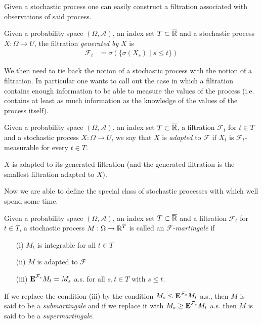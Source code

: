 Given a stochastic process one can easily construct a filtration
associated with observations of said process.
\begin{defn}Given a probability space $(\Omega,  \mathcal{A})$, an
  index set $T \subset \overline{\mathbb{R}}$ and a stochastic process $X
  : \Omega \to U$, the filtration \emph{generated by} $X$ is 
\begin{align*}
\mathcal{F}_t &= \sigma(\lbrace \sigma(X_s) \mid s \leq t \rbrace)
\end{align*}
\end{defn}

We then need to tie back the notion of a stochastic process with the
notion of a filtration.  In particular one wants to call out the case
in which a filtration contains enough information to be able to
measure the values of the process (i.e. contains at least as much
information as the knowledge of the values of the process itself).
\begin{defn}Given a probability space $(\Omega,  \mathcal{A})$, an
  index set $T \subset \overline{\mathbb{R}}$, a
  filtration $\mathcal{F}_t$ for $t \in T$ and a stochastic process $X
  : \Omega \to U$, we say that $X$ is \emph{adapted} to $\mathcal{F}$
  if $X_t$ is $\mathcal{F}_t$-measurable for every $t \in T$.
\end{defn}

\begin{examp}$X$ is adapted to its generated filtration (and the
  generated filtration is the smallest filtration adapted to $X$).
\end{examp}

Now we are able to define the special class of stochastic processes
with which well spend some time.
\begin{defn}Given a probability space $(\Omega,  \mathcal{A})$, an
  index set $T \subset \overline{\mathbb{R}}$ and a
  filtration $\mathcal{F}_t$ for $t \in T$, a stochastic process $M :
  \Omega \to \mathbb{R}^T$ is called an \emph{$\mathcal{F}$-martingale} if 
\begin{itemize}
\item[(i)]$M_t$ is integrable for all $t \in T$
\item[(ii)]$M$ is adapted to $\mathcal{F}$
\item[(iii)]$\textbf{E}^{\mathcal{F}_s} M_t = M_s$ a.s. for all
  $s,t \in T$ with $s \leq t$.
\end{itemize}
If we replace the condition (iii) by the condition
$M_s \leq \textbf{E}^{\mathcal{F}_s} M_t$ a.s., then $M$ is said to
be a \emph{submartingale} and if we replace it with
$M_s \geq \textbf{E}^{\mathcal{F}_s} M_t $ a.s. then $M$ is said to be a
\emph{supermartingale}.
\end{defn}

